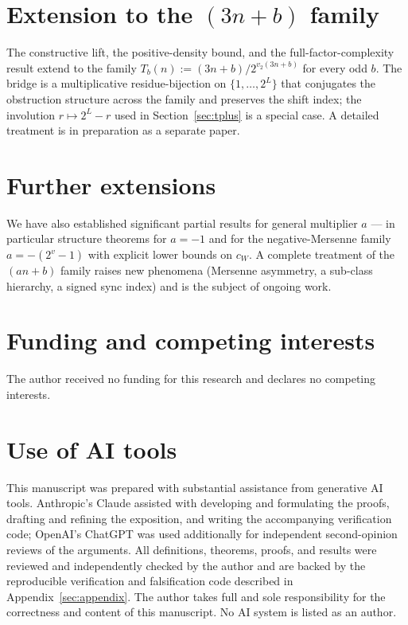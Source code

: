 \documentclass[11pt,reqno]{amsart}
\newcommand{\vtwo}{v_{2}}
\begin{document}
\section*{Extension to the \texorpdfstring{$(3n+b)$}{(3n+b)} family}

The constructive lift, the positive-density bound, and the
full-factor-complexity result extend to the family
$T_b(n) := (3n+b)/2^{\vtwo(3n+b)}$ for every odd $b$. The bridge is a
multiplicative residue-bijection on $\{1, \ldots, 2^L\}$ that
conjugates the obstruction structure across the family and preserves
the shift index; the involution $r \mapsto 2^L - r$ used in
Section~\ref{sec:tplus} is a special case. A detailed treatment is in
preparation as a separate paper.

\section*{Further extensions}

We have also established significant partial results for general multiplier $a$ ---
in particular structure theorems for $a = -1$ and for the
negative-Mersenne family $a = -(2^{v} - 1)$ with explicit lower bounds
on $c_W$. A complete treatment of the $(an+b)$ family raises new
phenomena (Mersenne asymmetry, a sub-class hierarchy, a signed sync
index) and is the subject of ongoing work.

\section*{Funding and competing interests}

The author received no funding for this research and declares no
competing interests.

\section*{Use of AI tools}

This manuscript was prepared with substantial assistance from generative AI
tools. Anthropic's Claude assisted with developing and formulating the proofs,
drafting and refining the exposition, and writing the
accompanying verification code; OpenAI's ChatGPT was used additionally for
independent second-opinion reviews of the arguments. All definitions, theorems,
proofs, and results were reviewed and independently checked by the author and
are backed by the reproducible verification and falsification code described in
Appendix~\ref{sec:appendix}. The author takes full and sole responsibility for
the correctness and content of this manuscript. No AI system is listed as an
author.
\end{document}
